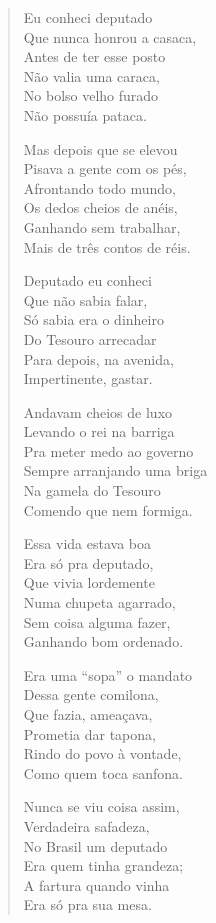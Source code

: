 \begin{verse}
Eu conheci deputado\\
Que nunca honrou a casaca,\\
Antes de ter esse posto\\
Não valia uma caraca,\\
No bolso velho furado\\
Não possuía pataca.

Mas depois que se elevou\\
Pisava a gente com os pés, \\
Afrontando todo mundo,\\
Os dedos cheios de anéis,\\
Ganhando sem trabalhar,\\
Mais de três contos de réis.

Deputado eu conheci\\
Que não sabia falar,\\
Só sabia era o dinheiro\\
Do Tesouro arrecadar\\
Para depois, na avenida,\\
Impertinente, gastar.
\pagebreak

Andavam cheios de luxo\\
Levando o rei na barriga\\
Pra meter medo ao governo\\
Sempre arranjando uma briga\\
Na gamela do Tesouro\\
Comendo que nem formiga.

Essa vida estava boa\\
Era só pra deputado,\\
Que vivia lordemente\\
Numa chupeta agarrado,\\
Sem coisa alguma fazer,\\
Ganhando bom ordenado.

Era uma “sopa” o mandato\\
Dessa gente comilona,\\
Que fazia, ameaçava,\\
Prometia dar tapona,\\
Rindo do povo à vontade,\\
Como quem toca sanfona.

Nunca se viu coisa assim,\\
Verdadeira safadeza,\\
No Brasil um deputado\\
Era quem tinha grandeza;\\
A fartura quando vinha\\
Era só pra sua mesa.
\pagebreak


\end{verse}

